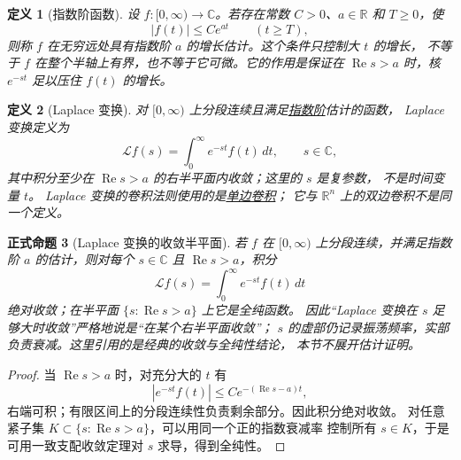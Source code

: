 \documentclass[UTF8,fontset=none,a4paper,11pt]{ctexart}
\theoremstyle{foundation-definition}
\newtheorem{definition}{定义}[section]
\theoremstyle{foundation-theorem}
\theoremstyle{foundation-proposition}
\newtheorem{proposition}[definition]{正式命题}
\theoremstyle{foundation-example}
\theoremstyle{foundation-remark}
\theoremstyle{foundation-theorem}
\newcommand{\term}[2]{\hyperref[#1]{#2}}
\begin{document}
\begin{definition}[指数阶函数]\label{def:exponential-order}
设 \(f:[0,\infty)\to\mathbb C\)。若存在常数 \(C>0\)、\(a\in\mathbb R\) 和 \(T\geq0\)，使
\[
|f(t)|\leq C e^{at}\qquad(t\geq T),
\]
则称 \(f\) 在无穷远处具有指数阶 \(a\) 的增长估计。这个条件只控制大 \(t\) 的增长，
不等于 \(f\) 在整个半轴上有界，也不等于它可微。它的作用是保证在
\(\operatorname{Re}s>a\) 时，核 \(e^{-st}\) 足以压住 \(f(t)\) 的增长。
\end{definition}

\begin{definition}[Laplace 变换]\label{def:laplace-transform}
对 \([0,\infty)\) 上分段连续且满足\term{def:exponential-order}{指数阶}估计的函数，
Laplace 变换定义为
\[
\mathcal Lf(s)=\int_0^\infty e^{-st}f(t)\,dt,
\qquad s\in\mathbb C,
\]
其中积分至少在 \(\operatorname{Re}s>a\) 的右半平面内收敛；这里的 \(s\) 是复参数，
不是时间变量 \(t\)。
Laplace 变换的卷积法则使用的是\term{def:one-sided-convolution}{单边卷积}；
它与 \(\mathbb R^n\) 上的双边卷积不是同一个定义。
\end{definition}

\begin{proposition}[Laplace 变换的收敛半平面]\label{prop:laplace-half-plane}
若 \(f\) 在 \([0,\infty)\) 上分段连续，并满足指数阶 \(a\) 的估计，则对每个
\(s\in\mathbb C\) 且 \(\operatorname{Re}s>a\)，积分
\[
\mathcal Lf(s)=\int_0^\infty e^{-st}f(t)\,dt
\]
绝对收敛；在半平面 \(\{s:\operatorname{Re}s>a\}\) 上它是全纯函数。
因此“Laplace 变换在 \(s\) 足够大时收敛”严格地说是“在某个右半平面收敛”；
\(s\) 的虚部仍记录振荡频率，实部负责衰减。这里引用的是经典的收敛与全纯性结论，
本节不展开估计证明。
\end{proposition}

\begin{proof}
当 \(\operatorname{Re}s>a\) 时，对充分大的 \(t\) 有
\[
|e^{-st}f(t)|\leq C e^{-(\operatorname{Re}s-a)t},
\]
右端可积；有限区间上的分段连续性负责剩余部分。因此积分绝对收敛。
对任意紧子集 \(K\subset\{s:\operatorname{Re}s>a\}\)，可以用同一个正的指数衰减率
控制所有 \(s\in K\)，于是可用一致支配收敛定理对 \(s\) 求导，得到全纯性。
\end{proof}
\end{document}
